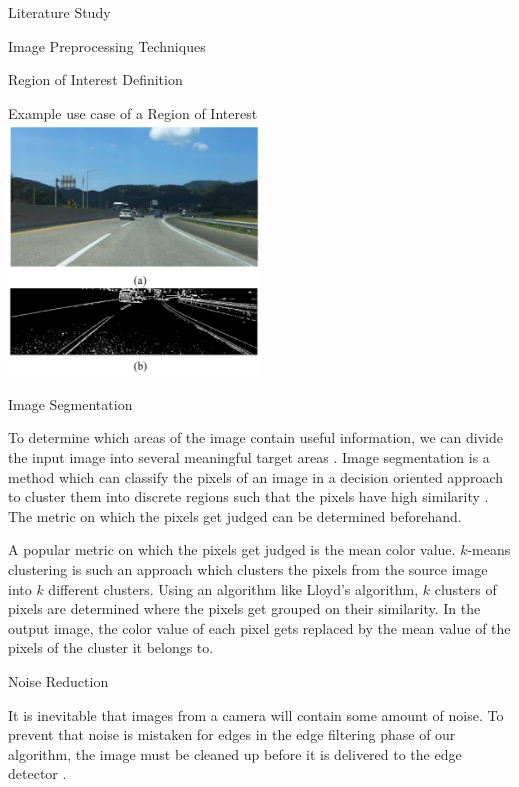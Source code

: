 \documentclass{matthijs}
\begin{document}
\begin{hoofdstuk}{Literature Study}
\begin{paragraaf}{Image Preprocessing Techniques}
\begin{subparagraaf}{Region of Interest Definition}
				\begin{figuur}{Example use case of a Region of Interest}
					\includegraphics[width=0.5\textwidth]{malmir2019design-img1.png}
					\cite{malmir2019design}
				\end{figuur}

			\end{subparagraaf}

			\begin{subparagraaf}{Image Segmentation}

				To determine which areas of the image contain useful information, we can divide the input image into several meaningful target areas \cite{shan2018image}.
				Image segmentation is a method which can classify the pixels of an image in a decision oriented approach to cluster them into discrete regions such that the pixels have high similarity \cite{dhanachandra2015image}.
				The metric on which the pixels get judged can be determined beforehand.

				\bigskip

				A popular metric on which the pixels get judged is the mean color value.
				$k$-means clustering is such an approach which clusters the pixels from the source image into $k$ different clusters.
				Using an algorithm like Lloyd's algorithm, $k$ clusters of pixels are determined where the pixels get grouped on their similarity.
				In the output image, the color value of each pixel gets replaced by the mean value of the pixels of the cluster it belongs to.

			\end{subparagraaf}

			\begin{subparagraaf}{Noise Reduction}

				It is inevitable that images from a camera will contain some amount of noise.
				To prevent that noise is mistaken for edges in the edge filtering phase of our algorithm, the image must be cleaned up before it is delivered to the edge detector \cite{sarab2020canny}.


\end{subparagraaf}
\end{paragraaf}
\end{hoofdstuk}
\end{document}
